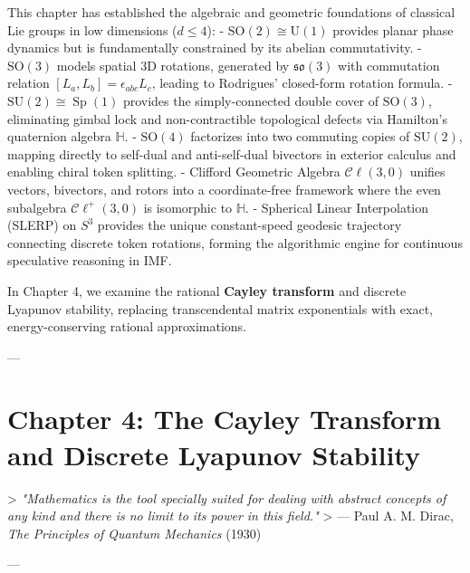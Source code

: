 \documentclass[11pt,twoside,openright]{amsbook}
\begin{document}
{{{{{{This chapter has established the algebraic and geometric foundations of classical Lie groups in low dimensions ($d \le 4$):
- $\mathrm{SO}(2) \cong \mathrm{U}(1)$ provides planar phase dynamics but is fundamentally constrained by its abelian commutativity.
- $\mathrm{SO}(3)$ models spatial 3D rotations, generated by $\mathfrak{so}(3)$ with commutation relation $[L_a, L_b] = \epsilon_{abc} L_c$, leading to Rodrigues' closed-form rotation formula.
- $\mathrm{SU}(2) \cong \operatorname{Sp}(1)$ provides the simply-connected double cover of $\mathrm{SO}(3)$, eliminating gimbal lock and non-contractible topological defects via Hamilton's quaternion algebra $\mathbb{H}$.
- $\mathrm{SO}(4)$ factorizes into two commuting copies of $\mathrm{SU}(2)$, mapping directly to self-dual and anti-self-dual bivectors in exterior calculus and enabling chiral token splitting.
- Clifford Geometric Algebra $\mathcal{C}\ell(3,0)$ unifies vectors, bivectors, and rotors into a coordinate-free framework where the even subalgebra $\mathcal{C}\ell^+(3,0)$ is isomorphic to $\mathbb{H}$.
- Spherical Linear Interpolation (SLERP) on $S^3$ provides the unique constant-speed geodesic trajectory connecting discrete token rotations, forming the algorithmic engine for continuous speculative reasoning in IMF.

In Chapter 4, we examine the rational \textbf{Cayley transform} and discrete Lyapunov stability, replacing transcendental matrix exponentials with exact, energy-conserving rational approximations.


---

\chapter{Chapter 4: The Cayley Transform and Discrete Lyapunov Stability}

> \textit{"Mathematics is the tool specially suited for dealing with abstract concepts of any kind and there is no limit to its power in this field."}  
> — Paul A. M. Dirac, \textit{The Principles of Quantum Mechanics} (1930)

---

}}}}}}
\end{document}

